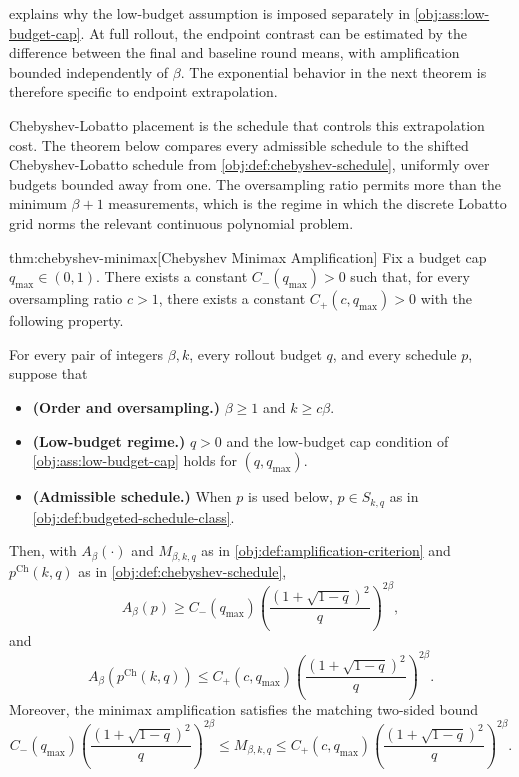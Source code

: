 \documentclass[11pt]{article}
\begin{document}
 explains why the low-budget assumption is imposed separately in \cref{obj:ass:low-budget-cap}. At full rollout, the endpoint contrast can be estimated by the difference between the final and baseline round means, with amplification bounded independently of \(\beta\). The exponential behavior in the next theorem is therefore specific to endpoint extrapolation.

Chebyshev-Lobatto placement is the schedule that controls this extrapolation cost. The theorem below compares every admissible schedule to the shifted Chebyshev-Lobatto schedule from \cref{obj:def:chebyshev-schedule}, uniformly over budgets bounded away from one. The oversampling ratio  permits more than the minimum \(\beta+1\) measurements, which is the regime in which the discrete Lobatto grid norms the relevant continuous polynomial problem.

\begin{theoremv}{thm:chebyshev-minimax}[Chebyshev Minimax Amplification]
Fix a budget cap \(q_{\max}\in(0,1)\). There exists a constant
\(C_-(q_{\max})>0\) such that, for every oversampling ratio \(c>1\), there
exists a constant \(C_+(c,q_{\max})>0\) with the following property.

For every pair of integers \(\beta,k\), every rollout budget \(q\), and every
schedule \(p\), suppose that
\begin{itemize}
\item \textbf{(Order and oversampling.)} \(\beta\ge 1\) and \(k\ge c\beta\).
\item \textbf{(Low-budget regime.)} \(q>0\) and the low-budget cap condition of
\cref{obj:ass:low-budget-cap} holds for \((q,q_{\max})\).
\item \textbf{(Admissible schedule.)} When \(p\) is used below, \(p\in S_{k,q}\)
as in \cref{obj:def:budgeted-schedule-class}.
\end{itemize}
Then, with \(A_\beta(\cdot)\) and \(M_{\beta,k,q}\) as in
\cref{obj:def:amplification-criterion} and
\(p^{\mathrm{Ch}}(k,q)\) as in \cref{obj:def:chebyshev-schedule},
\[
A_\beta(p)
\ge
C_-(q_{\max})
\left(\frac{(1+\sqrt{1-q})^2}{q}\right)^{2\beta},
\]
and
\[
A_\beta\!\left(p^{\mathrm{Ch}}(k,q)\right)
\le
C_+(c,q_{\max})
\left(\frac{(1+\sqrt{1-q})^2}{q}\right)^{2\beta}.
\]
Moreover, the minimax amplification satisfies the matching two-sided bound
\[
C_-(q_{\max})
\left(\frac{(1+\sqrt{1-q})^2}{q}\right)^{2\beta}
\le
M_{\beta,k,q}
\le
C_+(c,q_{\max})
\left(\frac{(1+\sqrt{1-q})^2}{q}\right)^{2\beta}.
\]
\end{theoremv}
\end{document}
